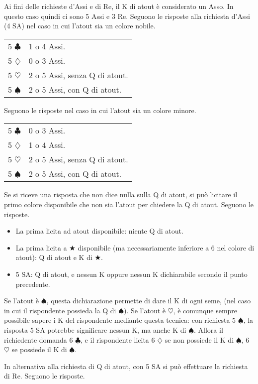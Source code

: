 \documentclass[a4paper,10pt]{article}
\renewcommand{\c}{$\clubsuit$\xspace}
\renewcommand{\d}{$\diamondsuit$\xspace}
\newcommand{\h}{$\heartsuit$\xspace}
\newcommand{\s}{$\spadesuit$\xspace}
\renewcommand{\j}{$\bigstar$\xspace}
\newcommand{\sa}{SA\xspace}
\newcommand{\smallspace}{\vskip0.3cm}
\newenvironment{twocol}
  {\smallspace\noindent\begin{tabular}{l p{0.78\textwidth}}}
  {\end{tabular}\smallspace}
\begin{document}
Ai fini delle richieste d'Assi e di Re, il K di atout è considerato un Asso. In questo caso quindi ci sono 5 Assi e 3 Re. Seguono le risposte alla richiesta d'Assi (4 \sa) nel caso in cui l'atout sia un colore nobile.
\begin{twocol}
5 \c & 1 o 4 Assi.\\
5 \d & 0 o 3 Assi.\\
5 \h & 2 o 5 Assi, senza Q di atout.\\
5 \s & 2 o 5 Assi, con Q di atout.\\
\end{twocol}
\noindent Seguono le risposte nel caso in cui l'atout sia un colore minore.
\begin{twocol}
5 \c & 0 o 3 Assi.\\
5 \d & 1 o 4 Assi.\\
5 \h & 2 o 5 Assi, senza Q di atout.\\
5 \s & 2 o 5 Assi, con Q di atout.\\
\end{twocol}

\noindent Se si riceve una risposta che non dice nulla sulla Q di atout, si può licitare il primo colore disponibile che non sia l'atout per chiedere la Q di atout. Seguono le risposte.

\begin{itemize}
 \item La prima licita ad atout disponibile: niente Q di atout.
 \item La prima licita a \j disponibile (ma necessariamente inferiore a 6 nel colore di atout): Q di atout e K di \j.
 \item 5 \sa: Q di atout, e nessun K oppure nessun K dichiarabile secondo il punto precedente.
\end{itemize}

Se l'atout è \s, questa dichiarazione permette di dare il K di ogni seme, (nel caso in cui il rispondente possieda la Q di \s). Se l'atout è \h, è comunque sempre possibile sapere i K del rispondente mediante questa tecnica: con richiesta 5 \s, la risposta 5 \sa potrebbe significare nessun K, ma anche K di \s.
Allora il richiedente domanda 6 \c, e il rispondente licita 6 \d se non possiede il K di \s, 6 \h se possiede il K di \s.


\smallspace

\noindent In alternativa alla richiesta di Q di atout, con 5 \sa si può effettuare la richiesta di Re. Seguono le risposte.
\end{document}
